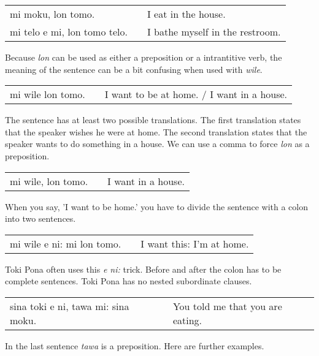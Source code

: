 \begin{supertabular}{p{5,5cm}|ll}
mi moku, lon tomo. && I eat in the house. \\
mi telo e mi, lon tomo telo. && I bathe myself in the restroom. \\
\end{supertabular} 

Because \textit{lon} can be used as either a preposition or a intrantitive verb, the meaning of the sentence can be a bit confusing when used with \textit{wile}. 

\begin{supertabular}{p{5,5cm}|ll}
mi wile lon tomo. && I want to be at home. / I want in a house. \\
\end{supertabular} 

The sentence has at least two possible translations. 
The first translation states that the speaker wishes he were at home. 
The second translation states that the speaker wants to do something in a house. 
We can use a comma to force \textit{lon} as a preposition.

\begin{supertabular}{p{5,5cm}|ll}
mi wile, lon tomo. && I want in a house. \\
\end{supertabular}

When you say, 'I want to be home.' you have to divide the sentence with a colon into two sentences.

\begin{supertabular}{p{5,5cm}|ll}
mi wile e ni: mi lon tomo. && I want this: I'm at home. \\
\end{supertabular} 

Toki Pona often uses this \textit{e ni:} trick. 
Before and after the colon has to be complete sentences. 
Toki Pona has no nested subordinate clauses.

\begin{supertabular}{p{5,5cm}|ll}
sina toki e ni, tawa mi: sina moku. && You told me that you are eating. \\
\end{supertabular} 

%
In the last sentence \textit{tawa} is a preposition. 
Here are further examples.

